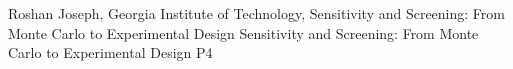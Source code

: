 {}	%
{}		%
{Roshan Joseph, Georgia Institute of Technology, Sensitivity and Screening: From Monte Carlo to Experimental Design}	%
{Sensitivity and Screening: From Monte Carlo to Experimental Design}		%
{P4}		%
\\\hline
